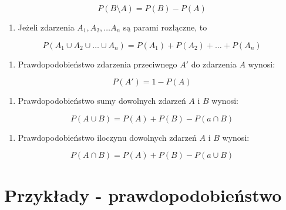 \documentclass[
  letterpaper,
  DIV=11,
  numbers=noendperiod]{scrreprt}
\providecommand{\tightlist}{%
  \setlength{\itemsep}{0pt}\setlength{\parskip}{0pt}}\usepackage{longtable,booktabs,array}
\begin{document}
\[ P(B \setminus A) = P(B) - P(A) \]

\begin{enumerate}
\def\labelenumi{\arabic{enumi}.}
\setcounter{enumi}{4}
\tightlist
\item
  Jeżeli zdarzenia \(A_1, A_2, \ldots A_n\) są parami rozłączne, to
\end{enumerate}

\[P(A_1 \cup A_2 \cup \ldots \cup A_n)=P(A_1)+P(A_2)+\ldots+P(A_n)\]

\begin{enumerate}
\def\labelenumi{\arabic{enumi}.}
\setcounter{enumi}{5}
\tightlist
\item
  Prawdopodobieństwo zdarzenia przeciwnego \(A'\) do zdarzenia \(A\)
  wynosi:
\end{enumerate}

\[ P(A') = 1 - P(A) \]

\begin{enumerate}
\def\labelenumi{\arabic{enumi}.}
\setcounter{enumi}{6}
\tightlist
\item
  Prawdopodobieństwo sumy dowolnych zdarzeń \(A\) i \(B\) wynosi:
\end{enumerate}

\[ P(A \cup B) = P(A) + P(B) - P(a \cap B)\]

\begin{enumerate}
\def\labelenumi{\arabic{enumi}.}
\setcounter{enumi}{7}
\tightlist
\item
  Prawdopodobieństwo iloczynu dowolnych zdarzeń \(A\) i \(B\) wynosi:
\end{enumerate}

\[ P(A \cap B) = P(A) + P(B) - P(a \cup B)\]

\section{Przykłady -
prawdopodobieństwo}\label{przykux142ady---prawdopodobieux144stwo}

\begin{tcolorbox}[enhanced jigsaw, toprule=.15mm, title=\textcolor{quarto-callout-tip-color}{\faLightbulb}\hspace{0.5em}{Przykład 3.7}, breakable, coltitle=black, titlerule=0mm, colbacktitle=quarto-callout-tip-color!10!white, opacitybacktitle=0.6, opacityback=0, bottomtitle=1mm, left=2mm, arc=.35mm, leftrule=.75mm, bottomrule=.15mm, rightrule=.15mm, toptitle=1mm, colframe=quarto-callout-tip-color-frame, colback=white]

\end{tcolorbox}
\end{document}
